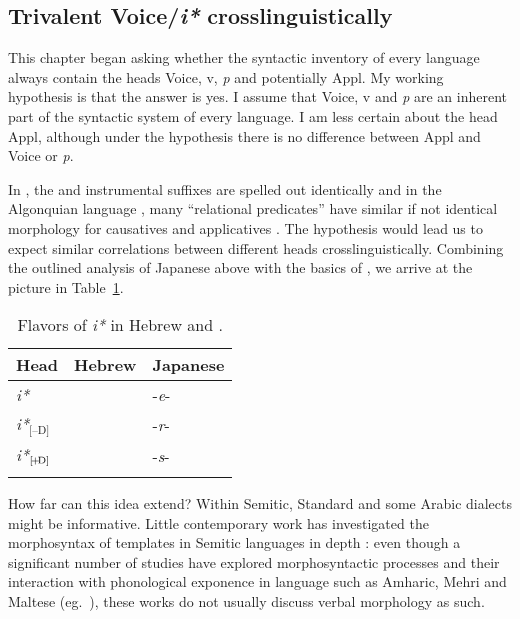 \begin{exe}
\begin{xlist}
\begin{xlist}
\begin{xlist}
\begin{xlist}
\begin{xlist}
\begin{xlist}
\begin{exe}
\begin{xlist}
\begin{exe}
\begin{exe}
\begin{xlist}
\begin{exe}
\begin{exe}
\begin{xlist}
\begin{exe}
\begin{xlist}
\begin{exe}
\begin{xlist}
\begin{exe}
\begin{xlist}
\begin{exe}
\begin{xlist}
	\subsection{Trivalent Voice/\textit{i*} crosslinguistically} \label{i:i:ay} \label{r1:g:1}
This chapter began asking whether the syntactic inventory of every language always contain the heads Voice, v, \textit{p} and potentially Appl. My working hypothesis is that the answer is yes. I assume that Voice, v and \emph{p} are an inherent part of the syntactic system of every language. I am less certain about the  head Appl, although under the \textit{} hypothesis there is no difference between Appl and Voice or \textit{p}. 

In , the  and instrumental  suffixes are spelled out identically \citep{jerro17} and in the Algonquian language , many ``relational predicates'' have similar if not identical morphology for causatives and applicatives \citep[Ch.~2.3.7.1]{quinn06phd}. The \emph{} hypothesis would lead us to expect similar correlations between different heads crosslinguistically. Combining the outlined analysis of Japanese above with the basics of \emph{}, we arrive at the picture in Table~\ref{table:heads-langs2}.
\begin{table}
	\begin{tabularx}{.5\textwidth}{lll}
 \lsptoprule
	Head 		& Hebrew 	  		& Japanese\\\midrule
	\emph{i*}   	& \tkal          & -\emph{e}-\\
	\emph{i*}$_{\text{[--D]}}$ 	& \tnif 		& -\emph{r}-\\
	\emph{i*}$_{\text{[\!+\!D]}}$	& \thif		& -\emph{s}-\\
\lspbottomrule
 	\end{tabularx}
	\caption{Flavors of \textit{i*} in Hebrew and .}
	\label{table:heads-langs2} 
\end{table}

How far can this idea extend? Within Semitic, Standard  and some Arabic dialects might be informative. Little contemporary work has investigated the morphosyntax of templates in Semitic languages in depth \citep{kastnertucker19cup}: even though a significant number of studies have explored morphosyntactic processes and their interaction with phonological exponence in language such as Amharic, Mehri and Maltese (eg.~\citealt{kramer14,kramer16li,doronkhan16,faust16,faust18gjgl,faust19,rood17phd,winchester17nels,winchester19phd,kalin18,akkus19jl}), these works do not usually discuss verbal morphology as such.


\end{xlist}
\end{exe}
\end{xlist}
\end{exe}
\end{xlist}
\end{exe}
\end{xlist}
\end{exe}
\end{xlist}
\end{exe}
\end{exe}
\end{xlist}
\end{exe}
\end{exe}
\end{xlist}
\end{exe}
\end{xlist}
\end{xlist}
\end{xlist}
\end{xlist}
\end{xlist}
\end{xlist}
\end{exe}

